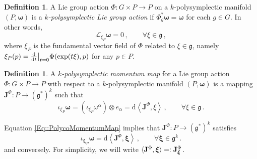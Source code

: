 \documentclass[11pt]{article}
\theoremstyle{plain}
\theoremstyle{definition}
\newtheorem{definition}[theorem]{Definition}
\newcommand\restr[2]{{%
  \left.\kern-\nulldelimiterspace %
  #1 %
  \right|_{#2} %
}}
\newcommand{\bomega}{{\boldsymbol{\omega}}}
\renewcommand{\d}{\mathrm{d}}
\newcommand*{\inn}[1]{\iota_{#1}}
\newcommand{\Lg}{\mathfrak{g}}
\newcommand{\Lie}{\mathscr{L}}
\def\d{\mathrm{d}}
\numberwithin{equation}{section}
\begin{document}
\begin{definition}
        A Lie group action $\Phi\colon G\times P\to P$ on a $k$-polysymplectic manifold $(P,\boldsymbol\omega)$ is  a \textit{$k$-polysymplectic Lie group action} if $\Phi_g^*\boldsymbol\omega=\boldsymbol\omega$ for each $g\in G$. In other words,
\begin{equation}
    \Lie_{\xi_P}\bomega = 0\,,\qquad \forall \xi\in\mathfrak{g}\,,
\end{equation}
where $\xi_P$ is the fundamental vector field of $\Phi$ related to $\xi\in\mathfrak{g}$, namely $\xi_P(p) = \restr{\frac{\d}{\d t}}{t=0}\Phi(\exp(t\xi),p)$ for any $p\in P$.
\end{definition} 

\begin{definition}
\label{Def::PolysymMomentumMap}
A {\it $k$-polysymplectic momentum map} for a Lie group action $\Phi: G\times P\rightarrow P$ with respect to a $k$-polysymplectic manifold $(P,\boldsymbol\omega)$ is a mapping $\mathbf{J}^\Phi:P\rightarrow (\mathfrak{g}^*)^k$ such that
\begin{equation}
\label{Eq::PolycoMomentumMap}
\inn{\xi_P}\boldsymbol\omega=(\inn{\xi_P}\omega^\alpha)\otimes e_\alpha=\d\left\langle \mathbf{J}^\Phi,\xi\right\rangle \,,\qquad \forall \xi\in \mathfrak{g}\,.
\end{equation}
\end{definition}
Equation \eqref{Eq::PolycoMomentumMap} implies that $\mathbf{J}^\Phi:P\rightarrow(\Lg^*)^k$ satisfies 
\begin{equation}
\label{Eq:EqCond}
\inn{\boldsymbol{\xi}_P}\boldsymbol{\omega}=\d\left\langle \mathbf{J}^\Phi,\boldsymbol{\xi}\right\rangle \,,\qquad\forall\boldsymbol{\xi}\in\Lg^k\,.
\end{equation}
and conversely. For simplicity, we will write $\langle {\bf J}^\Phi,\bm\xi\rangle=:{\bf J}^\Phi_{\bm\xi}$.%
\end{document}
